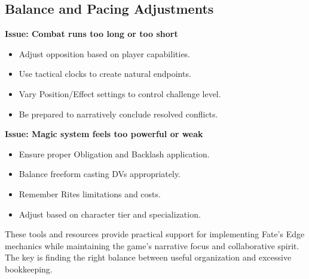 \subsection{Balance and Pacing Adjustments}
\label{subsec:balance-troubleshooting}

\textbf{Issue: Combat runs too long or too short}
\begin{itemize}
\item Adjust opposition based on player capabilities.
\item Use tactical clocks to create natural endpoints.
\item Vary Position/Effect settings to control challenge level.
\item Be prepared to narratively conclude resolved conflicts.
\end{itemize}

\textbf{Issue: Magic system feels too powerful or weak}
\begin{itemize}
\item Ensure proper Obligation and Backlash application.
\item Balance freeform casting DVs appropriately.
\item Remember Rites limitations and costs.
\item Adjust based on character tier and specialization.
\end{itemize}

These tools and resources provide practical support for implementing Fate's Edge mechanics while maintaining the game's narrative focus and collaborative spirit. The key is finding the right balance between useful organization and excessive bookkeeping.


